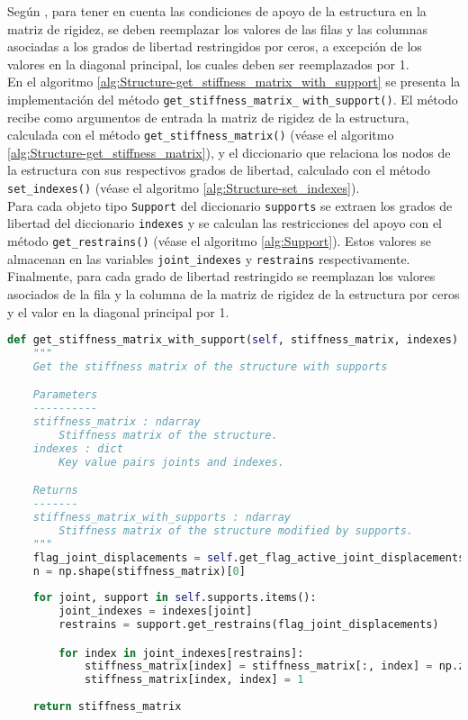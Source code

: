 Según \cite{reddy1993an}, para tener en cuenta las condiciones de apoyo de la estructura en la matriz de rigidez, se deben reemplazar los valores de las filas y las columnas asociadas a los grados de libertad restringidos por ceros, a excepción de los valores en la diagonal principal, los cuales deben ser reemplazados por 1.\\

En el algoritmo \ref{alg:Structure-get_stiffness_matrix_with_support} se presenta la implementación del método \verb|get_stiffness_matrix_| \verb|with_support()|. El método recibe como argumentos de entrada la matriz de rigidez de la estructura, calculada con el método \verb|get_stiffness_matrix()| (véase el algoritmo \ref{alg:Structure-get_stiffness_matrix}), y el diccionario que relaciona los nodos de la estructura con sus respectivos grados de libertad, calculado con el método \verb|set_indexes()| (véase el algoritmo \ref{alg:Structure-set_indexes}).\\

Para cada objeto tipo \verb|Support| del diccionario \verb|supports| se extraen los grados de libertad del diccionario \verb|indexes| y se calculan las restricciones del apoyo con el método \verb|get_restrains()| (véase el algoritmo \ref{alg:Support}). Estos valores se almacenan en las variables \verb|joint_indexes| y \verb|restrains| respectivamente.\\

Finalmente, para cada grado de libertad restringido se reemplazan los valores asociados de la fila y la columna de la matriz de rigidez de la estructura por ceros y el valor en la diagonal principal por 1.\\
\pagebreak

\begin{lstlisting}[language=Python,caption=Método \texttt{get\_stiffness\_matrix\_with\_support()} de la clase \texttt{Structure}.,label=alg:Structure-get_stiffness_matrix_with_support, frame=single]
def get_stiffness_matrix_with_support(self, stiffness_matrix, indexes):
    """
    Get the stiffness matrix of the structure with supports

    Parameters
    ----------
    stiffness_matrix : ndarray
        Stiffness matrix of the structure.
    indexes : dict
        Key value pairs joints and indexes.

    Returns
    -------
    stiffness_matrix_with_supports : ndarray
        Stiffness matrix of the structure modified by supports.
    """
    flag_joint_displacements = self.get_flag_active_joint_displacements()
    n = np.shape(stiffness_matrix)[0]
    
    for joint, support in self.supports.items():
        joint_indexes = indexes[joint]
        restrains = support.get_restrains(flag_joint_displacements)

        for index in joint_indexes[restrains]:
            stiffness_matrix[index] = stiffness_matrix[:, index] = np.zeros(n)
            stiffness_matrix[index, index] = 1
    
    return stiffness_matrix
\end{lstlisting}

